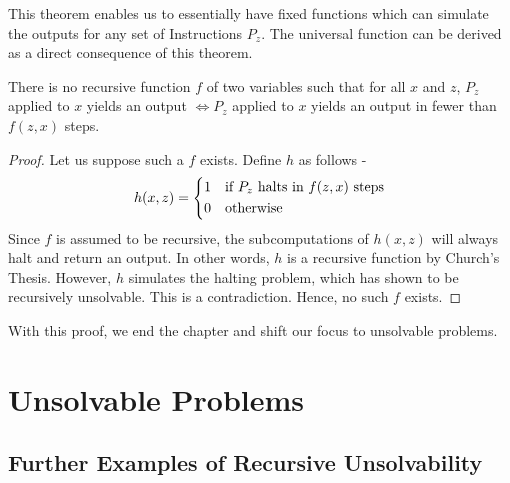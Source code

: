 \documentclass[openany]{book}
\begin{document}
\begin{mynote}
    This theorem enables us to essentially have fixed functions which can simulate the outputs for any set of Instructions $P_z$. The universal function can be derived as a direct consequence of this theorem. 
\end{mynote}
\begin{mytheorem}[Ex. 2-8 theorem]
    There is no recursive function $f$ of two variables such that for all $x$ and $z$, $P_z$ applied to $x$ yields an output $\iff P_z$ applied to $x$ yields an output in fewer than $f(z, x)$ steps. 
\end{mytheorem}
\begin{proof}
Let us suppose such a $f$ exists. Define $h$ as follows - 
$$h(x, z) = \begin{dcases}
    1 & \text{if $P_z$ halts in $f(z, x)$ steps} \\
    0 & \text{otherwise}
\end{dcases}$$
Since $f$ is assumed to be recursive, the subcomputations of $h(x, z)$ will always halt and return an output. In other words, $h$ is a recursive function by Church's Thesis. However, $h$ simulates the halting problem, which has shown to be recursively unsolvable. This is a contradiction. Hence, no such $f$ exists. 
\end{proof}
With this proof, we end the chapter and shift our focus to unsolvable problems. 

\chapter{Unsolvable Problems}
\section{Further Examples of Recursive Unsolvability}
\end{document}
